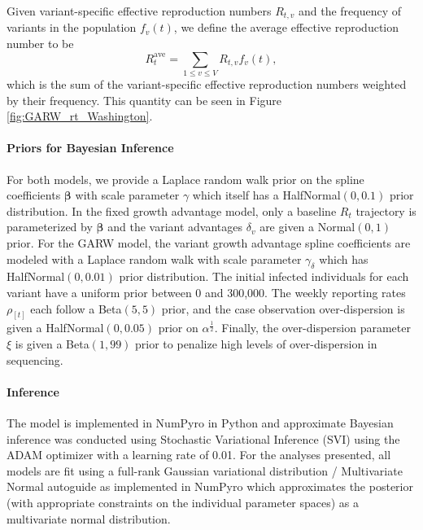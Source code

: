\documentclass[11pt,oneside,letterpaper]{article}
\renewcommand{\vec}[1]{\boldsymbol{#1}}
\begin{document}
Given variant-specific effective reproduction numbers $R_{t,v}$ and the frequency of variants in the population $f_{v}(t)$, we define the average effective reproduction number to be
\begin{equation}
  R_{t}^{\text{ave}} = \sum_{1\leq v \leq V} R_{t,v}f_{v}(t),
\end{equation}
which is the sum of the variant-specific effective reproduction numbers weighted by their frequency. This quantity can be seen in Figure \ref{fig:GARW_rt_Washington}.

\paragraph{Priors for Bayesian Inference}%

For both models, we provide a Laplace random walk prior on the spline coefficients $\vec{\beta}$ with scale parameter $\gamma$ which itself has a HalfNormal$(0, 0.1)$ prior distribution.
In the fixed growth advantage model, only a baseline $R_{t}$ trajectory is parameterized by $\vec{\beta}$ and the variant advantages $\delta_{v}$ are given a Normal$(0,1)$ prior.
For the GARW model, the variant growth advantage spline coefficients are modeled with a Laplace random walk with scale parameter $\gamma_{\delta}$ which has HalfNormal$(0, 0.01)$ prior distribution.
The initial infected individuals for each variant have a uniform prior between 0 and 300,000.
The weekly reporting rates $\rho_{[t]}$ each follow a Beta$(5, 5)$ prior, and the case observation over-dispersion is given a HalfNormal$(0, 0.05)$ prior on $\alpha^{\frac{1}{2}}$.
Finally, the over-dispersion parameter $\xi$ is given a Beta$(1, 99)$ prior to penalize high levels of over-dispersion in sequencing.

\paragraph{Inference}

The model is implemented in NumPyro \cite{phan2019composable} in Python and approximate Bayesian inference was conducted using Stochastic Variational Inference (SVI) \cite{hoffman2013svi} using the ADAM optimizer \cite{kingma2017adam} with a learning rate of 0.01. For the analyses presented, all models are fit using a full-rank Gaussian variational distribution / Multivariate Normal autoguide as implemented in NumPyro \cite{phan2019composable} which approximates the posterior (with appropriate constraints on the individual parameter spaces) as a multivariate normal distribution.
\end{document}
